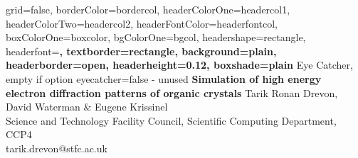 \documentclass[a0paper,portrait,fontscale=0.34]{baposter}
\begin{document}




\begin{poster}{
	grid=false,
	borderColor=bordercol,
	headerColorOne=headercol1,
	headerColorTwo=headercol2,
	headerFontColor=headerfontcol,
	boxColorOne=boxcolor,
	bgColorOne=bgcol,
	headershape=rectangle,
	headerfont=\Large\sf\bf,
	textborder=rectangle,
	background=plain,
	headerborder=open,
	headerheight=0.12\textheight,
  boxshade=plain
}
{
	Eye Catcher, empty if option eyecatcher=false - unused
}
{\sf\bf
	Simulation of high energy electron diffraction patterns of organic crystals
}
{
	\vspace{1em} Tarik Ronan Drevon, David Waterman \& Eugene Krissinel\\
	{\smaller Science and Technology Facility Council, Scientific Computing Department, CCP4}\\
	{\smaller	tarik.drevon@stfc.ac.uk}
}
{
	\setlength\fboxsep{0.25pt}
	\setlength\fboxrule{0.9pt}
}




\end{poster}
\end{document}
